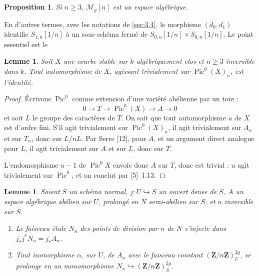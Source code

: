 \documentclass[12pt,a4paper]{article}
\theoremstyle{plain}
\newtheorem{lemma}[theorem]{Lemme}
\newtheorem{proposition}[theorem]{Proposition}
\theoremstyle{definition}
\theoremstyle{remark}
\DeclareMathOperator{\Pic}{Pic}
\begin{document}
\subsection{}

\begin{proposition}
Si $n \geq 3$, $\mathcal{M}_g[n]$ est un espace algébrique.
\end{proposition}

En d'autres termes, avec les notations de \ref{sec:3.4}, le morphisme $(d_0, d_1)$ identifie $S_{1,n}[1/n]$ à un sous-schéma fermé de $S_{0,n}[1/n] \times S_{0,n}[1/n]$. Le point essentiel est le

\begin{lemma}\label{lem:3.5.1}
Soit $X$ une courbe stable sur $k$ algébriquement clos et $n \geq 3$ inversible dans $k$. Tout automorphisme de $X$, agissant trivialement sur $\Pic^0(X)_n$, est l'identité.
\end{lemma}

\begin{proof}
Écrivons $\Pic^0$ comme extension d'une variété abélienne par un tore :
\[
0 \to T \to \Pic^0(X) \to A \to 0
\]
et soit $L$ le groupe des caractères de $T$. On sait que tout automorphisme $u$ de $X$ est d'ordre fini. S'il agit trivialement sur $\Pic^0(X)_n$, il agit trivialement sur $A_n$ et sur $T_n$, donc sur $L/nL$. Par Serre [12], pour $A$, et un argument direct analogue pour $L$, il agit trivialement sur $A$ et sur $L$, donc sur $T$.

L'endomorphisme $u - 1$ de $\Pic^0 X$ envoie donc $A$ sur $T$, donc est trivial : $u$ agit trivialement sur $\Pic^0$, et on conclut par [5]~1.13.
\end{proof}

\begin{lemma}\label{lem:3.5.2}
Soient $S$ un schéma normal, $j : U \hookrightarrow S$ un ouvert dense de $S$, $A$ un espace algébrique abélien sur $U$, prolongé en $N$ semi-abélien sur $S$, et $n$ inversible sur $S$.

\begin{enumerate}[label=(\roman*)]
\item Le faisceau étale $N_n$ des points de division par $n$ de $N$ s'injecte dans $j_* j^* N_n = j_* A_n$.
\item Tout isomorphisme $\alpha$, sur $U$, de $A_n$ avec le faisceau constant $(\mathbf{Z}/n\mathbf{Z})^{2g}_U$, se prolonge en un monomorphisme $N_n \hookrightarrow (\mathbf{Z}/n\mathbf{Z})^{2g}_S$.
\end{enumerate}
\end{lemma}
\end{document}

